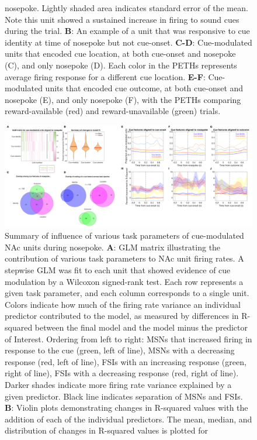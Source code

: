 \documentclass[11pt]{article}
\newcommand{\bsf}[1]{\textbf{#1}}
\begin{document}
{\begin{figure}[h]
{nosepoke. Lightly shaded area indicates standard error of the mean. Note this
unit showed a sustained increase in firing to sound cues during the trial. \bsf{B}: An
example of a unit that was responsive to cue identity at time of nosepoke but
not cue-onset. \bsf{C-D}: Cue-modulated units that encoded cue location, at
both cue-onset and nosepoke (C), and only nosepoke (D). Each color in the
PETHs represents average firing response for a different cue
location. \bsf{E-F}: Cue-modulated units that encoded cue outcome, at both
cue-onset and nosepoke (E), and only nosepoke (F), with the PETHs comparing
reward-available (red) and reward-unavailable (green) trials.}
\label{fig:NP_examples}
\end{figure}

\begin{figure}[h]
\centering
\includegraphics[width=\textwidth]{Fig 10 - NP GLM.png}
\caption{Summary of influence of various task parameters of cue-modulated NAc
units during nosepoke. \bsf{A}: GLM matrix illustrating the contribution of various
task parameters to NAc unit firing rates. A stepwise GLM was fit to each unit that
showed evidence of cue modulation by a Wilcoxon signed-rank test. Each row
represents a given task parameter, and each column corresponds to a single unit. Colors indicate how much of the firing rate variance an
individual predictor contributed to the model, as measured by differences in
R-squared between the final model and the model minus the predictor of
Interest. Ordering from left to right: MSNs that increased firing
in response to the cue (green, left of line), MSNs with a decreasing response
(red, left of line), FSIs with an increasing response (green, right of line),
FSIs with a decreasing response (red, right of line). Darker shades indicate
more firing rate variance explained by a given predictor. Black line indicates
separation of MSNs and FSIs. \bsf{B}: Violin plots demonstrating changes in
R-squared values with the addition of each of the individual predictors. The
mean, median, and distribution of changes in R-squared values is plotted for
}
\end{figure}}
\end{document}
